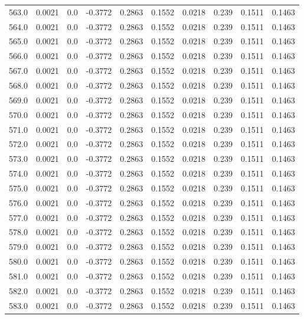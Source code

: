 \begin{longtable}{lrrrrrrrrr}
563.0 & 0.0021 & 0.0 & -0.3772 & 0.2863 & 0.1552 & 0.0218 & 0.239 & 0.1511 & 0.1463 \\
564.0 & 0.0021 & 0.0 & -0.3772 & 0.2863 & 0.1552 & 0.0218 & 0.239 & 0.1511 & 0.1463 \\
565.0 & 0.0021 & 0.0 & -0.3772 & 0.2863 & 0.1552 & 0.0218 & 0.239 & 0.1511 & 0.1463 \\
566.0 & 0.0021 & 0.0 & -0.3772 & 0.2863 & 0.1552 & 0.0218 & 0.239 & 0.1511 & 0.1463 \\
567.0 & 0.0021 & 0.0 & -0.3772 & 0.2863 & 0.1552 & 0.0218 & 0.239 & 0.1511 & 0.1463 \\
568.0 & 0.0021 & 0.0 & -0.3772 & 0.2863 & 0.1552 & 0.0218 & 0.239 & 0.1511 & 0.1463 \\
569.0 & 0.0021 & 0.0 & -0.3772 & 0.2863 & 0.1552 & 0.0218 & 0.239 & 0.1511 & 0.1463 \\
570.0 & 0.0021 & 0.0 & -0.3772 & 0.2863 & 0.1552 & 0.0218 & 0.239 & 0.1511 & 0.1463 \\
571.0 & 0.0021 & 0.0 & -0.3772 & 0.2863 & 0.1552 & 0.0218 & 0.239 & 0.1511 & 0.1463 \\
572.0 & 0.0021 & 0.0 & -0.3772 & 0.2863 & 0.1552 & 0.0218 & 0.239 & 0.1511 & 0.1463 \\
573.0 & 0.0021 & 0.0 & -0.3772 & 0.2863 & 0.1552 & 0.0218 & 0.239 & 0.1511 & 0.1463 \\
574.0 & 0.0021 & 0.0 & -0.3772 & 0.2863 & 0.1552 & 0.0218 & 0.239 & 0.1511 & 0.1463 \\
575.0 & 0.0021 & 0.0 & -0.3772 & 0.2863 & 0.1552 & 0.0218 & 0.239 & 0.1511 & 0.1463 \\
576.0 & 0.0021 & 0.0 & -0.3772 & 0.2863 & 0.1552 & 0.0218 & 0.239 & 0.1511 & 0.1463 \\
577.0 & 0.0021 & 0.0 & -0.3772 & 0.2863 & 0.1552 & 0.0218 & 0.239 & 0.1511 & 0.1463 \\
578.0 & 0.0021 & 0.0 & -0.3772 & 0.2863 & 0.1552 & 0.0218 & 0.239 & 0.1511 & 0.1463 \\
579.0 & 0.0021 & 0.0 & -0.3772 & 0.2863 & 0.1552 & 0.0218 & 0.239 & 0.1511 & 0.1463 \\
580.0 & 0.0021 & 0.0 & -0.3772 & 0.2863 & 0.1552 & 0.0218 & 0.239 & 0.1511 & 0.1463 \\
581.0 & 0.0021 & 0.0 & -0.3772 & 0.2863 & 0.1552 & 0.0218 & 0.239 & 0.1511 & 0.1463 \\
582.0 & 0.0021 & 0.0 & -0.3772 & 0.2863 & 0.1552 & 0.0218 & 0.239 & 0.1511 & 0.1463 \\
583.0 & 0.0021 & 0.0 & -0.3772 & 0.2863 & 0.1552 & 0.0218 & 0.239 & 0.1511 & 0.1463 \\

\end{longtable}
